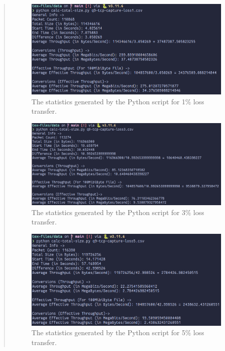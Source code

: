 \documentclass{article}
\newenvironment{ans}
   {\fbox{Answer}\begin{quote}\nopagebreak}
   {\end{quote}}
\begin{document}
\begin{ans}
\begin{figure}[H]
\centering
\includegraphics[width=16cm]{data/q9-stats-tcp-loss1.png}
\caption{The statistics generated by the Python script for 1\% loss transfer.}
\end{figure}

\begin{figure}[H]
\centering
\includegraphics[width=16cm]{data/q9-stats-tcp-loss3.png}
\caption{The statistics generated by the Python script for 3\% loss transfer.}
\end{figure}

\begin{figure}[H]
\centering
\includegraphics[width=16cm]{data/q9-stats-tcp-loss5.png}
\caption{The statistics generated by the Python script for 5\% loss transfer.}
\end{figure}


\end{ans}
\end{document}
